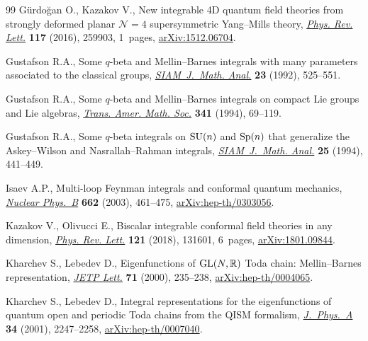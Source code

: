 \begin{thebibliography}{99}
G\"urdo\u{g}an O., Kazakov V., {N}ew integrable 4{D} quantum field theories
 from strongly deformed planar {$\mathcal{N}=4$} supersymmetric
 {Y}ang--{M}ills theory,
 \href{https://doi.org/10.1103/PhysRevLett.117.259903}{\textit{Phys. Rev.
 Lett.}} \textbf{117} (2016), 259903, 1~pages,
 \href{http://arxiv.org/abs/1512.06704}{arXiv:1512.06704}.

Gustafson R.A., Some {$q$}-beta and {M}ellin--{B}arnes integrals with many
 parameters associated to the classical groups,
 \href{https://doi.org/10.1137/0523026}{\textit{SIAM~J.~Math. Anal.}}
 \textbf{23} (1992), 525--551.

Gustafson R.A., Some {$q$}-beta and {M}ellin--{B}arnes integrals on compact
 {L}ie groups and {L}ie algebras,
 \href{https://doi.org/10.2307/2154615}{\textit{Trans. Amer. Math. Soc.}}
 \textbf{341} (1994), 69--119.

Gustafson R.A., Some {$q$}-beta integrals on {${\rm SU}(n)$} and {${\rm
 Sp}(n)$} that generalize the {A}skey--{W}ilson and {N}asrallah--{R}ahman
 integrals,
 \href{https://doi.org/10.1137/S0036141092248614}{\textit{SIAM~J.~Math.
 Anal.}} \textbf{25} (1994), 441--449.

Isaev A.P., Multi-loop {F}eynman integrals and conformal quantum mechanics,
 \href{https://doi.org/10.1016/S0550-3213(03)00393-6}{\textit{Nuclear
 Phys.~B}} \textbf{662} (2003), 461--475,
 \href{http://arxiv.org/abs/hep-th/0303056}{arXiv:hep-th/0303056}.

Kazakov V., Olivucci E., Biscalar integrable conformal field theories in any
 dimension,
 \href{https://doi.org/10.1103/PhysRevLett.121.131601}{\textit{Phys. Rev.
 Lett.}} \textbf{121} (2018), 131601, 6~pages,
 \href{http://arxiv.org/abs/1801.09844}{arXiv:1801.09844}.

Kharchev S., Lebedev D., Eigenfunctions of ${\rm GL}(N,\mathbb{R})$ {T}oda
 chain: {M}ellin--{B}arnes representation,
 \href{https://doi.org/10.1134/1.568323}{\textit{JETP Lett.}} \textbf{71}
 (2000), 235--238,
 \href{http://arxiv.org/abs/hep-th/0004065}{arXiv:hep-th/0004065}.

Kharchev S., Lebedev D., Integral representations for the eigenfunctions of
 quantum open and periodic {T}oda chains from the {QISM} formalism,
 \href{https://doi.org/10.1088/0305-4470/34/11/317}{\textit{J.~Phys.~A}}
 \textbf{34} (2001), 2247--2258,
 \href{http://arxiv.org/abs/hep-th/0007040}{arXiv:hep-th/0007040}.


\end{thebibliography}
